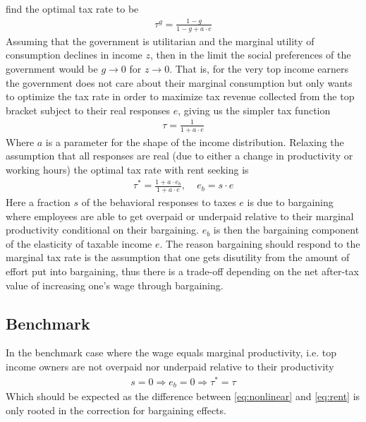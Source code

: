 \citet{piketty2013optimal} find the optimal tax rate to be
\begin{align}
  \tau^{g} = \frac{1-g}{1-g+a\cdot e} \label{eq:social}
\end{align}
Assuming that the government is utilitarian and the marginal utility of consumption declines in income $z$, then in the limit the social preferences of the government would be $g\rightarrow0$ for $z\rightarrow0$. That is, for the very top income earners the government does not care about their marginal consumption but only wants to optimize the tax rate in order to maximize tax revenue collected from the top bracket subject to their real responses $e$, giving us the simpler tax function
\begin{align}
  \tau = \frac{1}{1+a\cdot e} \label{eq:nonlinear}
\end{align}
Where $a$ is a parameter for the shape of the income distribution. Relaxing the assumption that all responses are real (due to either a change in productivity or working hours) the optimal tax rate with rent seeking is
\begin{align}
  \tau^{*} = \frac{1+a\cdot e_b}{1+a\cdot e},\ \ \ \ \ e_b=s\cdot e \label{eq:rent}
\end{align}
Here a fraction $s$ of the behavioral responses to taxes $e$ is due to bargaining where employees are able to get overpaid or underpaid relative to their marginal productivity conditional on their bargaining. $e_b$ is then the bargaining component of the elasticity of taxable income $e$. The reason bargaining should respond to the marginal tax rate is the assumption that one gets disutility from the amount of effort put into bargaining, thus there is a trade-off depending on the net after-tax value of increasing one's wage through bargaining.

\subsection{Benchmark}
In the benchmark case where the wage equals marginal productivity, i.e. top income owners are not overpaid nor underpaid relative to their productivity
\begin{align*}
  s=0\Rightarrow e_b=0 \Rightarrow \tau^{*} = \tau
\end{align*}
Which should be expected as the difference between \ref{eq:nonlinear} and \ref{eq:rent}
is only rooted in the correction for bargaining effects.

